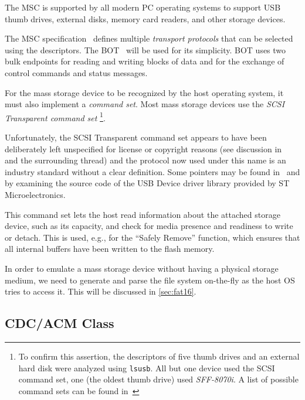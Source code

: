The \gls{MSC} is supported by all modern \gls{PC} operating systems to support \gls{USB} thumb drives, external disks, memory card readers, and other storage devices.


The \gls{MSC} specification~\cite{usbif-msco} defines multiple \textit{transport protocols} that can be selected using the descriptors. The \gls{BOT}~\cite{usbif-bot} will be used for its simplicity. \gls{BOT} uses two bulk endpoints for reading and writing blocks of data and for the exchange of control commands and status messages.

For the mass storage device to be recognized by the host operating system, it must also implement a \textit{command set}. Most mass storage devices use the \textit{\gls{SCSI} Transparent command set}
\footnote{To confirm this assertion, the descriptors of five thumb drives and an external hard disk were analyzed using \verb|lsusb|. All but one device used the SCSI command set, one (the oldest thumb drive) used \textit{SFF-8070i}. A list of possible command sets can be found in~\cite{usbif-msco}}.

Unfortunately, the \gls{SCSI} Transparent command set appears to have been deliberately left unspecified for license or copyright reasons (see discussion in~\cite{usb-tscsi-wtf} and the surrounding thread) and the protocol now used under this name is an industry standard without a clear definition. Some pointers may be found in~\cite{usb-tscsi} and by examining the source code of the USB Device driver library provided by ST Microelectronics.

This command set lets the host read information about the attached storage device, such as its capacity, and check for media presence and readiness to write or detach. This is used, e.g., for the ``Safely Remove'' function, which ensures that all internal buffers have been written to the flash memory.

In order to emulate a mass storage device without having a physical storage medium, we need to generate and parse the file system on-the-fly as the host \gls{OS} tries to access it. This will be discussed in \cref{sec:fat16}.

\subsection{CDC/ACM Class} \label{sec:cdc_acm}

